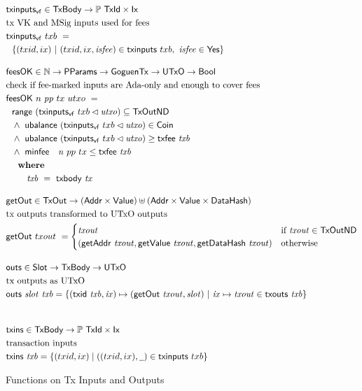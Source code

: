 \begin{figure}[htb]
  \begin{align*}
    & \fun{txinputs_{vf}} \in \TxBody \to \powerset{\TxId \times \Ix} \\
    & \text{tx VK and MSig inputs used for fees} \\
    & \fun{txinputs_{vf}} ~txb~= \\
    &~~\{ (txid,ix)~\vert~(txid,ix,\var{isfee}) \in
    \fun{txinputs} ~txb,~
     \var{isfee}\in\Yes\}
    \nextdef
    & \fun{feesOK} \in \N \to \PParams \to \GoguenTx \to \UTxO \to \Bool  \\
    & \text{check if fee-marked inputs are Ada-only and enough to cover fees} \\
    & \fun{feesOK} ~n~\var{pp}~tx~utxo~= \\
    &~~\fun{range}~(\fun{txinputs_{vf}}~{txb} \restrictdom \var{utxo}) \subseteq \TxOutND ~ \\
    &~~\wedge~ \fun{ubalance}~(\fun{txinputs_{vf}}~{txb} \restrictdom \var{utxo}) \in \Coin \\
    &~~      \wedge~ \fun{ubalance}~(\fun{txinputs_{vf}}~{txb} \restrictdom \var{utxo}) \geq \txfee{txb} ~ \\
    &~~      \wedge~ \minfee~n~{pp}~{tx} \leq \txfee{txb} \\
    &~~      \where \\
    & ~~~~~~~ \var{txb}~=~\txbody{tx}
    \nextdef
    & \fun{getOut} \in \TxOut \to (\Addr \times \Value) \uniondistinct (\Addr \times \Value \times \DataHash)  \\
    & \text{tx outputs transformed to UTxO outputs} \\
    & \fun{getOut} ~{txout}~= \begin{cases}
         \var{txout}  & \text{if~} \var{txout} \in \TxOutND \\
              (\fun{getAddr}~\var{txout}, \fun{getValue}~\var{txout},
              \fun{getDataHash}~\var{txout}) & \text{otherwise}
            \end{cases}
    \nextdef
    & \fun{outs} \in \Slot \to \TxBody \to \UTxO \\
    & \text{tx outputs as UTxO} \\
    & \fun{outs} ~ \var{slot}~\var{txb} =
        \left\{
          (\fun{txid} ~ \var{txb}, \var{ix}) \mapsto (\fun{getOut}~\var{txout},\var{slot}) ~
          \middle|~
          \var{ix} \mapsto \var{txout} \in \txouts{txb}
        \right\} \\
    \nextdef
    & \fun{txins} \in \TxBody \to \powerset{\TxId \times \Ix} \\
    & \text{transaction inputs} \\
    & \fun{txins} ~\var{txb} = \{(txid,ix) \mid ((txid,ix),\wcard)\in\fun{txinputs} ~txb\} \\
  \end{align*}
  \caption{Functions on Tx Inputs and Outputs}
  \label{fig:functions:insouts}
\end{figure}


